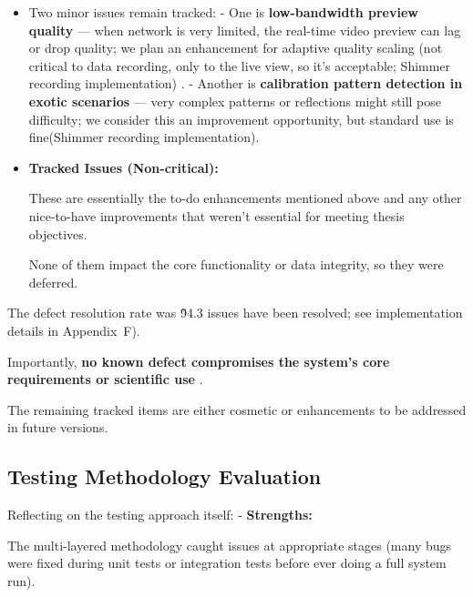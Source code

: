 {{{{{{{{{{{{{{\begin{itemize}
Minor issues were things like UI responsiveness under high CPU load (improved by
moving some work to background threads), handling of edge-case calibration
patterns (improved with additional user guidance if detection fails), a slight
delay on network reconnection (optimized; Shimmer recording implementation), and
file format compatibility with third-party tools (addressed by offering
alternative export formats).

\item Two minor issues remain tracked: - One is \textbf{low-bandwidth preview quality}
--- when network is very limited, the real-time video preview can lag or drop quality; we plan an enhancement for adaptive quality scaling (not critical to data recording, only to the live view, so it's acceptable; Shimmer recording implementation)
. - Another is \textbf{calibration pattern detection in exotic scenarios}
--- very complex patterns or reflections might still pose difficulty; we
consider this an improvement opportunity, but standard use is fine(Shimmer
recording implementation).

\item \textbf{Tracked Issues (Non-critical):}

These are essentially the to-do enhancements mentioned above and any other
nice-to-have improvements that weren't essential for meeting thesis objectives.

None of them impact the core functionality or data integrity, so they were
deferred.

\end{itemize}

The defect resolution rate was \~94.3%
issues have been resolved; see implementation details in Appendix~F).

Importantly, \textbf{no known defect compromises the system's core requirements or scientific use}
.

The remaining tracked items are either cosmetic or enhancements to be addressed
in future versions.

\subsection{Testing Methodology Evaluation}

Reflecting on the testing approach itself: - \textbf{Strengths:}

The multi-layered methodology caught issues at appropriate stages (many bugs
were fixed during unit tests or integration tests before ever doing a full
system run).

}}}}}}}}}}}}}}
